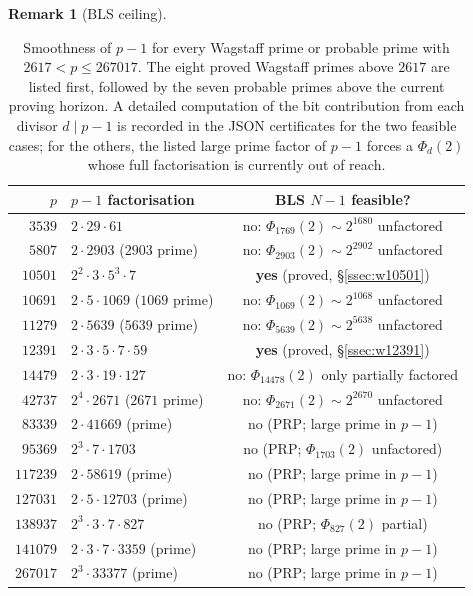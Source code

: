 \documentclass[11pt,a4paper]{amsart}
\theoremstyle{plain}
\theoremstyle{definition}
\newtheorem{remark}[theorem]{Remark}
\begin{document}
\begin{remark}[BLS ceiling]
\begin{table}[h]
\centering
\begin{tabular}{rlc}
\toprule
$p$ & $p - 1$ factorisation & BLS $N - 1$ feasible? \\
\midrule
$ 3539$ & $2 \cdot 29 \cdot 61$                      & no: $\Phi_{1769}(2) \sim 2^{1680}$ unfactored \\
$ 5807$ & $2 \cdot 2903$ \; ($2903$ prime)           & no: $\Phi_{2903}(2) \sim 2^{2902}$ unfactored \\
$10501$ & $2^2 \cdot 3 \cdot 5^3 \cdot 7$            & \textbf{yes} (proved, §\ref{ssec:w10501}) \\
$10691$ & $2 \cdot 5 \cdot 1069$ \; ($1069$ prime)   & no: $\Phi_{1069}(2) \sim 2^{1068}$ unfactored \\
$11279$ & $2 \cdot 5639$ \; ($5639$ prime)           & no: $\Phi_{5639}(2) \sim 2^{5638}$ unfactored \\
$12391$ & $2 \cdot 3 \cdot 5 \cdot 7 \cdot 59$       & \textbf{yes} (proved, §\ref{ssec:w12391}) \\
$14479$ & $2 \cdot 3 \cdot 19 \cdot 127$             & no: $\Phi_{14478}(2)$ only partially factored \\
$42737$ & $2^4 \cdot 2671$ \; ($2671$ prime)         & no: $\Phi_{2671}(2) \sim 2^{2670}$ unfactored \\
\midrule
$83339$  & $2 \cdot 41669$ \; (prime)                & no (PRP; large prime in $p-1$) \\
$95369$  & $2^3 \cdot 7 \cdot 1703$                  & no (PRP; $\Phi_{1703}(2)$ unfactored) \\
$117239$ & $2 \cdot 58619$ \; (prime)                & no (PRP; large prime in $p-1$) \\
$127031$ & $2 \cdot 5 \cdot 12703$ \; (prime)        & no (PRP; large prime in $p-1$) \\
$138937$ & $2^3 \cdot 3 \cdot 7 \cdot 827$           & no (PRP; $\Phi_{827}(2)$ partial) \\
$141079$ & $2 \cdot 3 \cdot 7 \cdot 3359$ \; (prime) & no (PRP; large prime in $p-1$) \\
$267017$ & $2^3 \cdot 33377$ \; (prime)              & no (PRP; large prime in $p-1$) \\
\bottomrule
\end{tabular}
\caption{Smoothness of $p - 1$ for every Wagstaff prime or probable
prime with $2617 < p \leq 267017$. The eight proved Wagstaff primes
above $2617$ are listed first, followed by the seven probable primes
above the current proving horizon. A detailed computation of the bit
contribution from each divisor $d \mid p - 1$ is recorded in the JSON
certificates for the two feasible cases; for the others, the listed
large prime factor of $p - 1$ forces a $\Phi_d(2)$ whose full
factorisation is currently out of reach.}
\label{tab:ceiling}
\end{table}


\end{remark}
\end{document}
